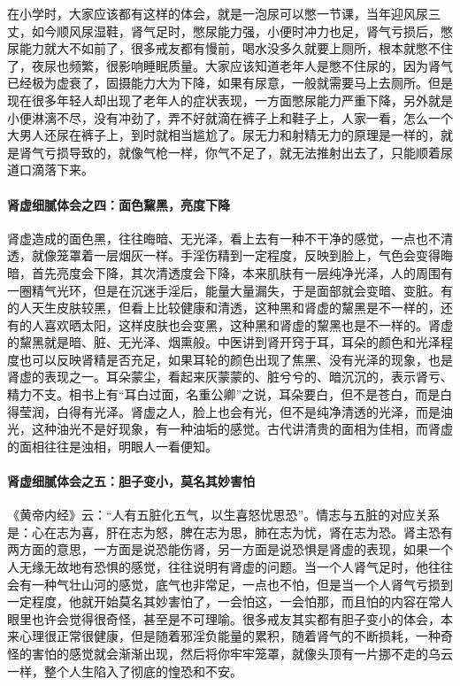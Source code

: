 在小学时，大家应该都有这样的体会，就是一泡尿可以憋一节课，当年迎风尿三丈，如今顺风尿湿鞋，肾气足时，憋尿能力强，小便时冲力也足，肾气亏损后，憋尿能力就大不如前了，很多戒友都有慢前，喝水没多久就要上厕所，根本就憋不住了，夜尿也频繁，很影响睡眠质量。大家应该知道老年人是憋不住尿的，因为肾气已经极为虚衰了，固摄能力大为下降，如果有尿意，一般就需要马上去厕所。但是现在很多年轻人却出现了老年人的症状表现，一方面憋尿能力严重下降，另外就是小便淋漓不尽，没有冲劲了，弄不好就滴在裤子上和鞋子上，人家一看，怎么一个大男人还尿在裤子上，到时就相当尴尬了。尿无力和射精无力的原理是一样的，就是肾气亏损导致的，就像气枪一样，你气不足了，就无法推射出去了，只能顺着尿道口滴落下来。

\paragraph{肾虚细腻体会之四：面色黧黑，亮度下降}

肾虚造成的面色黑，往往晦暗、无光泽，看上去有一种不干净的感觉，一点也不清透，就像笼罩着一层烟灰一样。手淫伤精到一定程度，反映到脸上，气色会变得晦暗，首先亮度会下降，其次清透度会下降，本来肌肤有一层纯净光泽，人的周围有一圈精气光环，但是在沉迷手淫后，能量大量漏失，于是面部就会变暗、变脏。有的人天生皮肤较黑，但看上比较健康和清透，这种黑和肾虚的黧黑是不一样的，还有的人喜欢晒太阳，这样皮肤也会变黑，这种黑和肾虚的黧黑也是不一样的。肾虚的黧黑就是暗、脏、无光泽、烟熏般。中医讲到肾开窍于耳，耳朵的颜色和光泽程度也可以反映肾精是否充足，如果耳轮的颜色出现了焦黑、没有光泽的现象，也是肾虚的表现之一。耳朵蒙尘，看起来灰蒙蒙的、脏兮兮的、暗沉沉的，表示肾亏、精力不支。相书上有“耳白过面，名重公卿”之说，耳朵要白，但不是苍白，而是白得莹润，白得有光泽。肾虚之人，脸上也会有光，但不是纯净清透的光泽，而是油光，这种油光不是好现象，有一种油垢的感觉。古代讲清贵的面相为佳相，而肾虚的面相往往是浊相，明眼人一看便知。

\paragraph{肾虚细腻体会之五：胆子变小，莫名其妙害怕}

《黄帝内经》云：“人有五脏化五气，以生喜怒忧思恐”。情志与五脏的对应关系是：心在志为喜，肝在志为怒，脾在志为思，肺在志为忧，肾在志为恐。肾主恐有两方面的意思，一方面是说恐能伤肾，另一方面是说恐惧是肾虚的表现，如果一个人无缘无故地有恐惧的感觉，往往说明有肾虚的问题。当一个人肾气足时，他往往会有一种气壮山河的感觉，底气也非常足，一点也不怕，但是当一个人肾气亏损到一定程度，他就开始莫名其妙害怕了，一会怕这，一会怕那，而且怕的内容在常人眼里也许会觉得很奇怪，甚至是不可理喻。很多戒友其实都有胆子变小的体会，本来心理很正常很健康，但是随着邪淫负能量的累积，随着肾气的不断损耗，一种奇怪的害怕的感觉就会渐渐出现，然后将你牢牢笼罩，就像头顶有一片挪不走的乌云一样，整个人生陷入了彻底的惶恐和不安。

